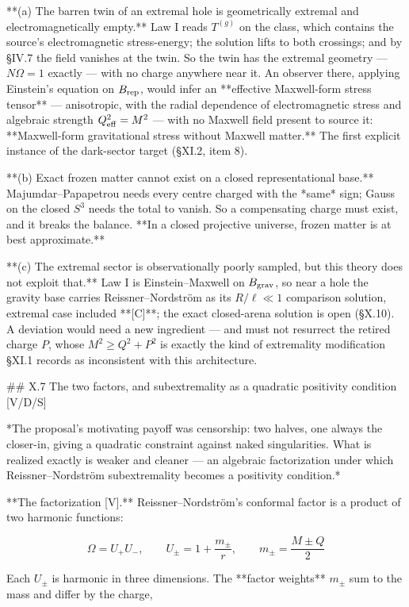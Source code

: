 **(a) The barren twin of an extremal hole is geometrically extremal and electromagnetically empty.** Law I reads $T^{(g)}$ on the class, which contains the source's electromagnetic stress-energy; the solution lifts to both crossings; and by §IV.7 the field vanishes at the twin. So the twin has the extremal geometry — $N\Omega = 1$ exactly — with no charge anywhere near it. An observer there, applying Einstein's equation on $B_{\rm rep}$, would infer an **effective Maxwell-form stress tensor** — anisotropic, with the radial dependence of electromagnetic stress and algebraic strength $Q_{\rm eff}^2 = M^2$ — with no Maxwell field present to source it: **Maxwell-form gravitational stress without Maxwell matter.** The first explicit instance of the dark-sector target (§XI.2, item 8).

**(b) Exact frozen matter cannot exist on a closed representational base.** Majumdar–Papapetrou needs every centre charged with the *same* sign; Gauss on the closed $S^3$ needs the total to vanish. So a compensating charge must exist, and it breaks the balance. **In a closed projective universe, frozen matter is at best approximate.**

**(c) The extremal sector is observationally poorly sampled, but this theory does not exploit that.** Law I is Einstein–Maxwell on $B_{\rm grav}$, so near a hole the gravity base carries Reissner–Nordström as its $R/\ell\ll1$ comparison solution, extremal case included **[C]**; the exact closed-arena solution is open (§X.10). A deviation would need a new ingredient — and must not resurrect the retired charge $P$, whose $M^2\geq Q^2+P^2$ is exactly the kind of extremality modification §XI.1 records as inconsistent with this architecture.

## X.7 The two factors, and subextremality as a quadratic positivity condition [V/D/S]

*The proposal's motivating payoff was censorship: two halves, one always the closer-in, giving a quadratic constraint against naked singularities. What is realized exactly is weaker and cleaner — an algebraic factorization under which Reissner–Nordström subextremality becomes a positivity condition.*

**The factorization [V].** Reissner–Nordström's conformal factor is a product of two harmonic functions:

$$\Omega = U_+U_-,\qquad U_\pm = 1+\frac{m_\pm}{r},\qquad m_\pm = \frac{M\pm Q}{2}$$

Each $U_\pm$ is harmonic in three dimensions. The **factor weights** $m_\pm$ sum to the mass and differ by the charge,

